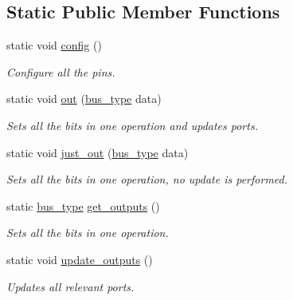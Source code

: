 \subsection*{Static Public Member Functions}
\begin{DoxyCompactItemize}
\item 
static void \hyperlink{structavrpp_1_1bus_1_1output__bus_a8d0d373e9cbbf92f1ca708b4eb3db4ff}{config} ()
\begin{DoxyCompactList}\small\item\em Configure all the pins. \item\end{DoxyCompactList}\item 
static void \hyperlink{structavrpp_1_1bus_1_1output__bus_a868a8ee86862ca7c8e4461d9df2f204d}{out} (\hyperlink{structavrpp_1_1bus_1_1output__bus_a02bf22de8447c8097a3c77e0f896a3b4}{bus\_\-type} data)
\begin{DoxyCompactList}\small\item\em Sets all the bits in one operation and updates ports. \item\end{DoxyCompactList}\item 
static void \hyperlink{structavrpp_1_1bus_1_1output__bus_a66c21e91d3fb705103c9f6e0ea3c78ed}{just\_\-out} (\hyperlink{structavrpp_1_1bus_1_1output__bus_a02bf22de8447c8097a3c77e0f896a3b4}{bus\_\-type} data)
\begin{DoxyCompactList}\small\item\em Sets all the bits in one operation, no update is performed. \item\end{DoxyCompactList}\item 
static \hyperlink{structavrpp_1_1bus_1_1output__bus_a02bf22de8447c8097a3c77e0f896a3b4}{bus\_\-type} \hyperlink{structavrpp_1_1bus_1_1output__bus_afde0f61a25d81d42a4f29e4cc5f431c7}{get\_\-outputs} ()
\begin{DoxyCompactList}\small\item\em Sets all the bits in one operation. \item\end{DoxyCompactList}\item 
static void \hyperlink{structavrpp_1_1bus_1_1output__bus_a28dd258c4ee8edab4f7ca55b0268fc5d}{update\_\-outputs} ()
\begin{DoxyCompactList}\small\item\em Updates all relevant ports. \item\end{DoxyCompactList}\end{DoxyCompactItemize}


